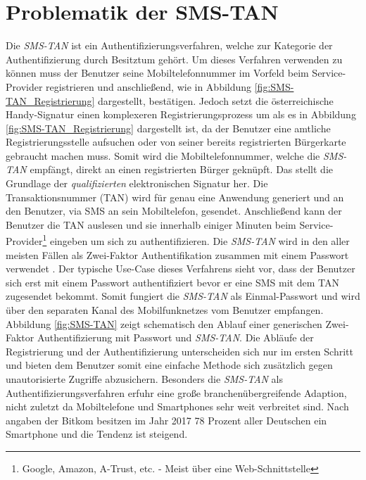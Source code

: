 \documentclass[11pt,a4paper,ngerman]{scrreprt}
\begin{document}
\section{Problematik der SMS-TAN}\label{sec:smstan-problematik}
Die \textit{SMS-TAN} ist ein Authentifizierungsverfahren, welche zur Kategorie der Authentifizierung durch Besitztum gehört. Um dieses Verfahren verwenden zu können muss der Benutzer seine Mobiltelefonnummer im Vorfeld beim Service-Provider registrieren und anschließend, wie in Abbildung \ref{fig:SMS-TAN_Registrierung} dargestellt, bestätigen. Jedoch setzt die österreichische Handy-Signatur einen komplexeren Registrierungsprozess um als es in Abbildung \ref{fig:SMS-TAN_Registrierung} dargestellt ist, da der Benutzer eine amtliche Registrierungsstelle aufsuchen oder von seiner bereits registrierten Bürgerkarte gebraucht machen muss. Somit wird die Mobiltelefonnummer, welche die \textit{SMS-TAN} empfängt, direkt an einen registrierten Bürger geknüpft. Das stellt die Grundlage der \emph{qualifizierten} elektronischen Signatur her. Die Transaktionsnummer (TAN) wird für genau eine Anwendung generiert und an den Benutzer, via SMS an sein Mobiltelefon, gesendet. Anschließend kann der Benutzer die TAN auslesen und sie innerhalb einiger Minuten beim Service-Provider\footnote{Google, Amazon, A-Trust, etc. - Meist über eine Web-Schnittstelle} eingeben um sich zu authentifizieren. Die \textit{SMS-TAN} wird in den aller meisten Fällen als Zwei-Faktor Authentifikation zusammen mit einem Passwort verwendet \cite{fido17}. Der typische Use-Case dieses Verfahrens sieht vor, dass der Benutzer sich erst mit einem Passwort authentifiziert bevor er eine SMS mit dem TAN zugesendet bekommt. Somit fungiert die \textit{SMS-TAN} als Einmal-Passwort und wird über den separaten Kanal des Mobilfunknetzes vom Benutzer empfangen. Abbildung \ref{fig:SMS-TAN} zeigt schematisch den Ablauf einer generischen Zwei-Faktor Authentifizierung mit Passwort und \textit{SMS-TAN}. Die Abläufe der Registrierung und der Authentifizierung unterscheiden sich nur im ersten Schritt und bieten dem Benutzer somit eine einfache Methode sich zusätzlich gegen unautorisierte Zugriffe abzusichern. Besonders die \textit{SMS-TAN} als Authentifizierungsverfahren erfuhr eine große branchenübergreifende Adaption, nicht zuletzt da Mobiltelefone und Smartphones sehr weit verbreitet sind. Nach angaben der Bitkom besitzen im Jahr 2017 78 Prozent aller Deutschen ein Smartphone \cite{bitkomMob} und die Tendenz ist steigend.
\end{document}
